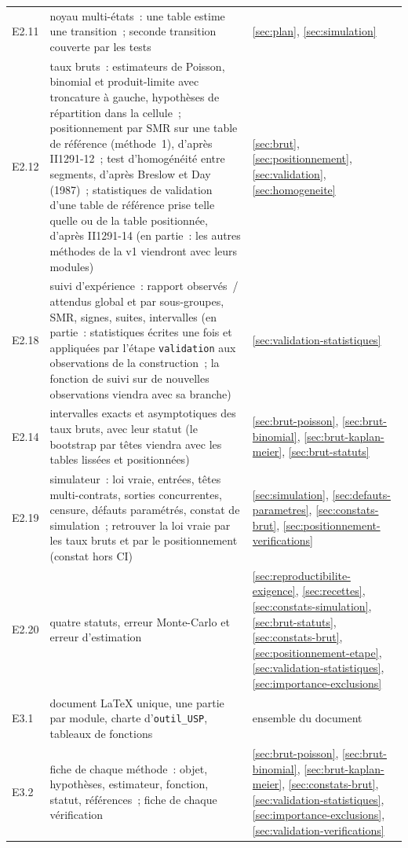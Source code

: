\documentclass[a4paper,11pt]{article}
\newcommand{\code}[1]{\texttt{\small #1}}
\begin{document}
{\begin{longtable}{@{}p{1.6cm}p{8.6cm}p{4.6cm}@{}}
E2.11 & noyau multi-états~: une table estime une transition~; seconde transition couverte par les tests & \ref{sec:plan}, \ref{sec:simulation} \\
E2.12 & taux bruts~: estimateurs de Poisson, binomial et produit-limite avec troncature à gauche, hypothèses de répartition dans la cellule~; positionnement par SMR sur une table de référence (méthode~1), d'après II1291-12~; test d'homogénéité entre segments, d'après Breslow et Day (1987)~; statistiques de validation d'une table de référence prise telle quelle ou de la table positionnée, d'après II1291-14 (en partie~: les autres méthodes de la v1 viendront avec leurs modules) & \ref{sec:brut}, \ref{sec:positionnement}, \ref{sec:validation}, \ref{sec:homogeneite} \\
E2.18 & suivi d'expérience~: rapport observés~/ attendus global et par sous-groupes, SMR, signes, suites, intervalles (en partie~: statistiques écrites une fois et appliquées par l'étape \code{validation} aux observations de la construction~; la fonction de suivi sur de nouvelles observations viendra avec sa branche) & \ref{sec:validation-statistiques} \\
E2.14 & intervalles exacts et asymptotiques des taux bruts, avec leur statut (le bootstrap par têtes viendra avec les tables lissées et positionnées) & \ref{sec:brut-poisson}, \ref{sec:brut-binomial}, \ref{sec:brut-kaplan-meier}, \ref{sec:brut-statuts} \\
E2.19 & simulateur~: loi vraie, entrées, têtes multi-contrats, sorties concurrentes, censure, défauts paramétrés, constat de simulation~; retrouver la loi vraie par les taux bruts et par le positionnement (constat hors CI) & \ref{sec:simulation}, \ref{sec:defauts-parametres}, \ref{sec:constats-brut}, \ref{sec:positionnement-verifications} \\
E2.20 & quatre statuts, erreur Monte-Carlo et erreur d'estimation & \ref{sec:reproductibilite-exigence}, \ref{sec:recettes}, \ref{sec:constats-simulation}, \ref{sec:brut-statuts}, \ref{sec:constats-brut}, \ref{sec:positionnement-etape}, \ref{sec:validation-statistiques}, \ref{sec:importance-exclusions} \\
E3.1 & document LaTeX unique, une partie par module, charte d'\code{outil\_USP}, tableaux de fonctions & ensemble du document \\
E3.2 & fiche de chaque méthode~: objet, hypothèses, estimateur, fonction, statut, références~; fiche de chaque vérification & \ref{sec:brut-poisson}, \ref{sec:brut-binomial}, \ref{sec:brut-kaplan-meier}, \ref{sec:constats-brut}, \ref{sec:validation-statistiques}, \ref{sec:importance-exclusions}, \ref{sec:validation-verifications} \\

\end{longtable}}
\end{document}
